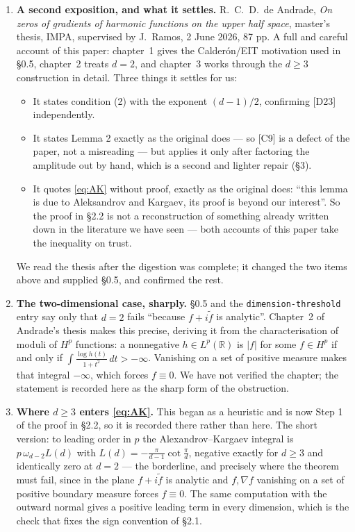 \documentclass[11pt,reqno]{amsart}
\theoremstyle{plain}
\theoremstyle{definition}
\theoremstyle{plain}
\theoremstyle{definition}
\theoremstyle{remark}
\newcommand{\Ledger}[1]{{\scriptsize\textsf{[#1]}}}
\begin{document}
\begin{enumerate}[leftmargin=1.6em,itemsep=4pt]
\item \textbf{A second exposition, and what it settles.} R.~C.~D.~de Andrade,
  \emph{On zeros of gradients of harmonic functions on the upper half space},
  master's thesis, IMPA, supervised by J.~Ramos, 2 June 2026, 87 pp. A full and
  careful account of this paper: chapter~1 gives the Calder\'on/EIT motivation used
  in \S0.5, chapter~2 treats $d=2$, and chapter~3 works through the $d\ge3$
  construction in detail. Three things it settles for us:
  \begin{itemize}[leftmargin=1.4em,itemsep=2pt]
  \item It states condition (2) with the exponent $(d-1)/2$, confirming \Ledger{D23}
    independently.
  \item It states Lemma 2 exactly as the original does --- so \Ledger{C9} is a defect
    of the paper, not a misreading --- but applies it only after factoring the
    amplitude out by hand, which is a second and lighter repair (\S3).
  \item It quotes \eqref{eq:AK} without proof, exactly as the original does: ``this
    lemma is due to Aleksandrov and Kargaev, its proof is beyond our interest''. So
    the proof in \S2.2 is not a reconstruction of something already written down in
    the literature we have seen --- both accounts of this paper take the inequality
    on trust.
  \end{itemize}
  We read the thesis after the digestion was complete; it changed the two items above
  and supplied \S0.5, and confirmed the rest.

\item \textbf{The two-dimensional case, sharply.} \S0.5 and the
  \texttt{dimension-threshold} entry say only that $d=2$ fails ``because $f+i\tilde f$
  is analytic''. Chapter~2 of Andrade's thesis makes this precise, deriving it from
  the characterisation of moduli of $H^p$ functions: a nonnegative $h\in L^p(\mathbb R)$
  is $|f|$ for some $f\in H^p$ if and only if
  $\int\frac{\log h(t)}{1+t^2}\,dt>-\infty$. Vanishing on a set of positive measure
  makes that integral $-\infty$, which forces $f\equiv0$. We have not verified the
  chapter; the statement is recorded here as the sharp form of the obstruction.

\item \textbf{Where $d\ge3$ enters \eqref{eq:AK}.} This began as a heuristic and is
  now Step 1 of the proof in \S2.2, so it is recorded there rather than here. The
  short version: to leading order in $p$ the Alexandrov--Kargaev integral is
  $p\,\omega_{d-2}L(d)$ with $L(d)=-\frac{\pi}{d-1}\cot\frac{\pi}{d}$, negative exactly
  for $d\ge3$ and identically zero at $d=2$ --- the borderline, and precisely where the
  theorem must fail, since in the plane $f+i\tilde f$ is analytic and $f,\nabla f$
  vanishing on a set of positive boundary measure forces $f\equiv0$. The same
  computation with the outward normal gives a positive leading term in every
  dimension, which is the check that fixes the sign convention of \S2.1.

\end{enumerate}
\end{document}
